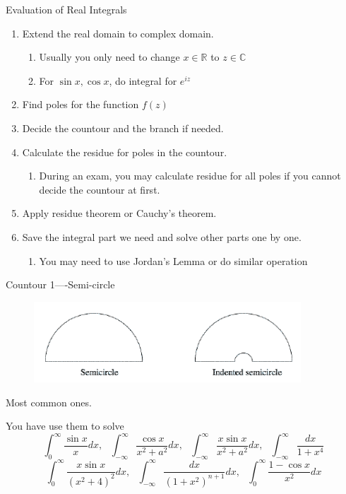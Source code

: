 \documentclass{beamer}
\begin{document}
\begin{frame}
\begin{block}{Evaluation of Real Integrals}
\begin{enumerate}
\item Extend the real domain to complex domain.
\begin{enumerate}
\item Usually you only need to change $x\in \mathbb{R}$ to $z\in\mathbb{C}$
\item For $\sin x, \cos x$, do integral for $e^{iz}$
\end{enumerate} 
\item Find poles for the function $f(z)$
\item Decide the countour and the branch if needed.
\item Calculate the residue for poles in the countour.
\begin{enumerate}
\item During an exam, you may calculate residue for all poles if you cannot decide the countour at first.
\end{enumerate}
\item Apply residue theorem or Cauchy's theorem.
\item Save the integral part we need and solve other parts one by one.
\begin{enumerate}
\item You may need to use Jordan's Lemma or do similar operation 
\end{enumerate}
\end{enumerate}
\end{block}
\end{frame}


\begin{frame}
\begin{block}{Countour 1----Semi-circle}
\begin{figure}[h]
    \centering
    \includegraphics[width=10cm]{semicircle.png}
\end{figure}
Most common ones.

You have use them to solve 
$$\int_0^{\infty}\dfrac{\sin x}{x}dx,\,\,\,\,\int_{-\infty}^{\infty}\dfrac{\cos x}{x^2+a^2}dx,\,\,\,\,\int_{-\infty}^{\infty}\dfrac{x\sin x}{x^2+a^2}dx,\,\,\,\,\int_{-\infty}^{\infty}\dfrac{dx}{1+x^4}$$
$$\int_0^{\infty}\dfrac{x\sin x}{(x^2+4)^2}dx,\,\,\,\,\int_{-\infty}^{\infty}\dfrac{dx}{(1+x^2)^{n+1}}dx,\,\,\,\,\int_{0}^{\infty}\dfrac{1-\cos x}{x^2}dx$$
\end{block}
\end{frame}
\end{document}
